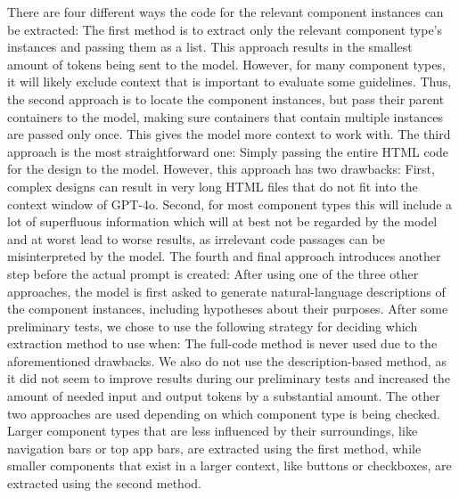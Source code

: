 \documentclass[11pt,titlepage,oneside,openany]{book}
\begin{document}
There are four different ways the code for the relevant component instances can be extracted: The first method is to extract only the relevant component type's instances and passing them as a list. This approach results in the smallest amount of tokens being sent to the model. However, for many component types, it will likely exclude context that is important to evaluate some guidelines. Thus, the second approach is to locate the component instances, but pass their parent containers to the model, making sure containers that contain multiple instances are passed only once. This gives the model more context to work with. The third approach is the most straightforward one: Simply passing the entire HTML code for the design to the model. However, this approach has two drawbacks: First, complex designs can result in very long HTML files that do not fit into the context window of GPT-4o. Second, for most component types this will include a lot of superfluous information which will at best not be regarded by the model and at worst lead to worse results, as irrelevant code passages can be misinterpreted by the model. The fourth and final approach introduces another step before the actual prompt is created: After using one of the three other approaches, the model is first asked to generate natural-language descriptions of the component instances, including hypotheses about their purposes. After some preliminary tests, we chose to use the following strategy for deciding which extraction method to use when: The full-code method is never used due to the aforementioned drawbacks. We also do not use the description-based method, as it did not seem to improve results during our preliminary tests and increased the amount of needed input and output tokens by a substantial amount. The other two approaches are used depending on which component type is being checked. Larger component types that are less influenced by their surroundings, like navigation bars or top app bars, are extracted using the first method, while smaller components that exist in a larger context, like buttons or checkboxes, are extracted using the second method.
\end{document}
